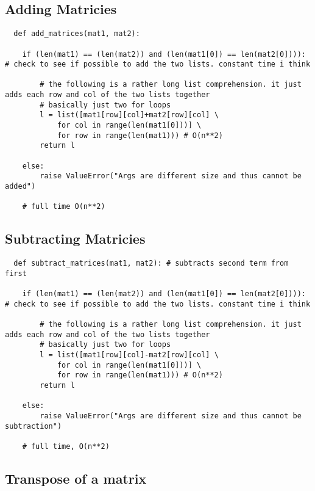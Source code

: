 \documentclass[12pt, a4paper]{article}
\begin{document}
\subsection{Adding Matricies}

\begin{lstlisting}
  def add_matrices(mat1, mat2): 

    if (len(mat1) == (len(mat2)) and (len(mat1[0]) == len(mat2[0]))): # check to see if possible to add the two lists. constant time i think

        # the following is a rather long list comprehension. it just adds each row and col of the two lists together
        # basically just two for loops
        l = list([mat1[row][col]+mat2[row][col] \
            for col in range(len(mat1[0]))] \
            for row in range(len(mat1))) # O(n**2)
        return l
    
    else:
        raise ValueError("Args are different size and thus cannot be added")
    
    # full time O(n**2)
\end{lstlisting}

\subsection{Subtracting Matricies}

\begin{lstlisting}
  def subtract_matrices(mat1, mat2): # subtracts second term from first

    if (len(mat1) == (len(mat2)) and (len(mat1[0]) == len(mat2[0]))): # check to see if possible to add the two lists. constant time i think

        # the following is a rather long list comprehension. it just adds each row and col of the two lists together
        # basically just two for loops
        l = list([mat1[row][col]-mat2[row][col] \
            for col in range(len(mat1[0]))] \
            for row in range(len(mat1))) # O(n**2)
        return l

    else:
        raise ValueError("Args are different size and thus cannot be subtraction")
    
    # full time, O(n**2)
\end{lstlisting}

\subsection{Transpose of a matrix}
\end{document}
